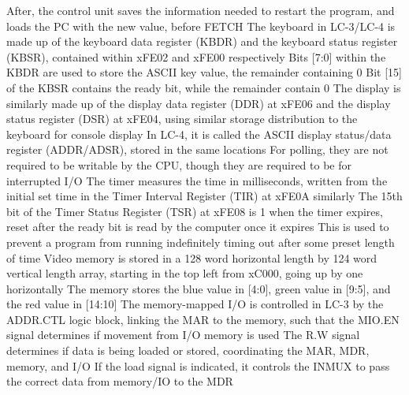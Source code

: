 \documentclass[11 pt, twoside]{article}
\newenvironment{outline*}
{
	\begin{outline}[enumerate]
	}
	{\end{outline}
}
\begin{document}
\begin{outline*}
\4 After, the control unit saves the information needed to restart the program, and loads the PC with the new value, before FETCH
\1 The keyboard in LC-3/LC-4 is made up of the keyboard data register (KBDR) and the keyboard status register (KBSR), contained within xFE02 and xFE00 respectively
\2 Bits [7:0] within the KBDR are used to store the ASCII key value, the remainder containing 0
\2 Bit [15] of the KBSR contains the ready bit, while the remainder contain 0
\2 The display is similarly made up of the display data register (DDR) at xFE06 and the display status register (DSR) at xFE04, using similar storage distribution to the keyboard for console display
\3 In LC-4, it is called the ASCII display status/data register (ADDR/ADSR), stored in the same locations
\2 For polling, they are not required to be writable by the CPU, though they are required to be for interrupted I/O
\2 The timer measures the time in milliseconds, written from the initial set time in the Timer Interval Register (TIR) at xFE0A similarly
\3 The 15th bit of the Timer Status Register (TSR) at xFE08 is 1 when the timer expires, reset after the ready bit is read by the computer once it expires
\3 This is used to prevent a program from running indefinitely timing out after some preset length of time
\2 Video memory is stored in a 128 word horizontal length by 124 word vertical length array, starting in the top left from xC000, going up by one horizontally
\3 The memory stores the blue value in [4:0], green value in [9:5], and the red value in [14:10]
\1 The memory-mapped I/O is controlled in LC-3 by the ADDR.CTL logic block, linking the MAR to the memory, such that the MIO.EN signal determines if movement from I/O memory is used
\2 The R.W signal determines if data is being loaded or stored, coordinating the MAR, MDR, memory, and I/O
\2 If the load signal is indicated, it controls the INMUX to pass the correct data from memory/IO to the MDR
\end{outline*}
\end{document}
